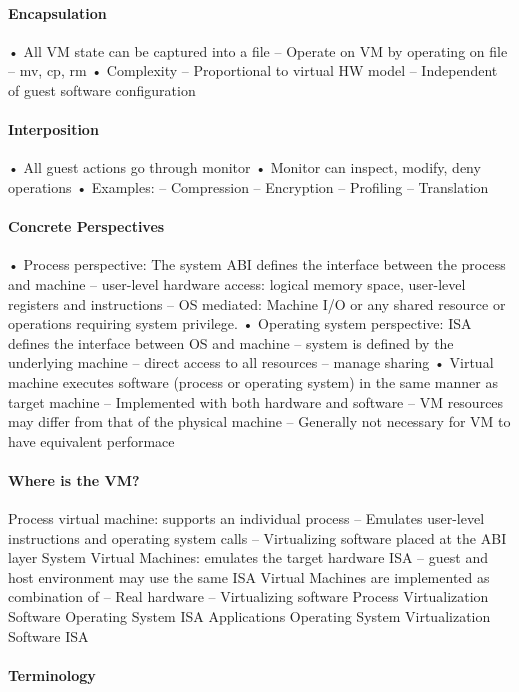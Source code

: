 \documentclass[10pt]{article}
\begin{document}
\paragraph{Encapsulation}
•  All VM state can be captured into a file
–  Operate on VM by operating on file
–  mv, cp, rm
•  Complexity
–  Proportional to virtual HW model
–  Independent of guest software configuration

\paragraph{Interposition}
•  All guest actions go through monitor
•  Monitor can inspect, modify, deny
operations
•  Examples:
–  Compression
–  Encryption
–  Profiling
–  Translation

\paragraph{Concrete Perspectives}
•  Process perspective: The system ABI defines the interface
between the process and machine
–  user-level hardware access: logical memory space, user-level
registers and instructions
–  OS mediated: Machine I/O or any shared resource or operations
requiring system privilege.
•  Operating system perspective: ISA defines the interface between
OS and machine
–  system is defined by the underlying machine
–  direct access to all resources
–  manage sharing
•  Virtual machine executes software (process or operating system)
in the same manner as target machine
–  Implemented with both hardware and software
–  VM resources may differ from that of the physical machine
–  Generally not necessary for VM to have equivalent performace

\paragraph{Where is the VM?}
Process virtual machine: supports an individual process
–  Emulates user-level instructions and operating system calls
–  Virtualizing software placed at the ABI layer
System Virtual Machines: emulates the target hardware ISA
–  guest and host environment may use the same ISA
Virtual Machines are implemented as combination of
–  Real hardware
–  Virtualizing software
Process
Virtualization Software
Operating System
ISA
Applications
Operating System
Virtualization Software
ISA


\paragraph{Terminology}
\end{document}
